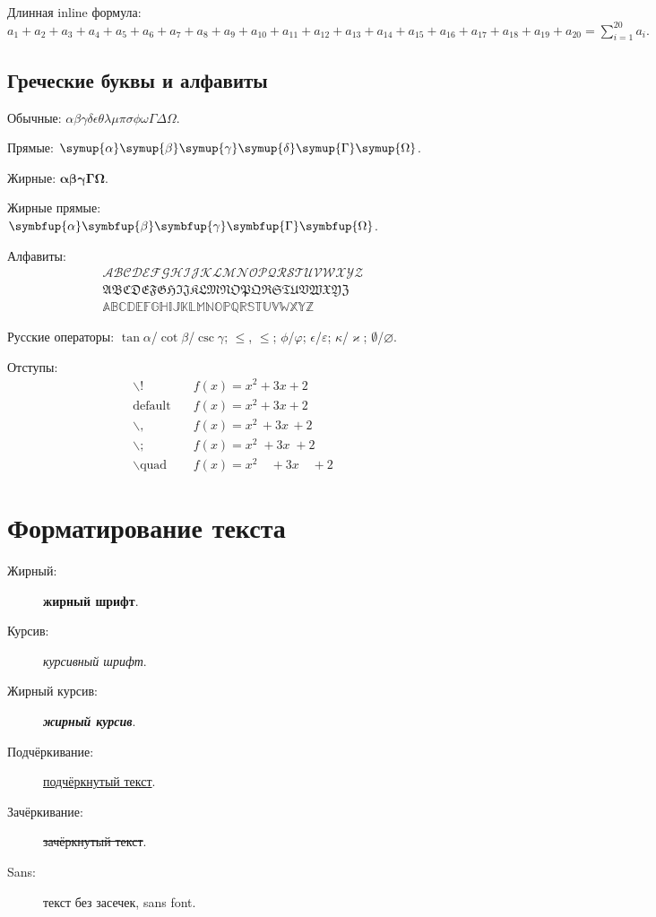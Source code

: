 \documentclass[font=modern]{cmcmsuthesis-cw}
\begin{document}
Длинная inline формула:
$a_1+a_2+a_3+a_4+a_5+a_6+a_7+a_8+a_9+a_{10}+a_{11}+a_{12}+a_{13}+a_{14}+a_{15}+a_{16}+a_{17}+a_{18}+a_{19}+a_{20}=\sum_{i=1}^{20}a_i.$

\subsection{Греческие буквы и алфавиты}

Обычные: $\alpha\beta\gamma\delta\epsilon\theta\lambda\mu\pi\sigma\phi\omega\Gamma\Delta\Omega$.

Прямые: $\symup{\alpha}\symup{\beta}\symup{\gamma}\symup{\delta}\symup{\Gamma}\symup{\Omega}$.

Жирные: $\symbf{\alpha}\symbf{\beta}\symbf{\gamma}\symbf{\Gamma}\symbf{\Omega}$.

Жирные прямые: $\symbfup{\alpha}\symbfup{\beta}\symbfup{\gamma}\symbfup{\Gamma}\symbfup{\Omega}$.

Алфавиты:
\[\begin{aligned}
\mathcal{ABCDEFGHIJKLMNOPQRSTUVWXYZ}\\
\mathfrak{ABCDEFGHIJKLMNOPQRSTUVWXYZ}\\
\mathbb{ABCDEFGHIJKLMNOPQRSTUVWXYZ}
\end{aligned}\]

Русские операторы: $\tan\alpha$/$\cot\beta$/$\csc\gamma$;
$\le$, $\leqslant$; $\phi$/$\varphi$; $\epsilon$/$\varepsilon$;
$\kappa$/$\varkappa$; $\emptyset$/$\varnothing$.

Отступы:
\[\begin{aligned}
\backslash! &\quad f(x)=x^2\!+3x\!+2\\
\text{default}&\quad f(x)=x^2+3x+2\\
\backslash, &\quad f(x)=x^2\,+3x\,+2\\
\backslash; &\quad f(x)=x^2\;+3x\;+2\\
\backslash\text{quad}&\quad f(x)=x^2\quad+3x\quad+2
\end{aligned}\]

\section{Форматирование текста}

\begin{description}
\item[Жирный:] \textbf{жирный шрифт}.
\item[Курсив:] \emph{курсивный шрифт}.
\item[Жирный курсив:] \textbf{\emph{жирный курсив}}.
\item[Подчёркивание:] \underline{подчёркнутый текст}.
\item[Зачёркивание:] \sout{зачёркнутый текст}.
\item[Sans:] \textsf{текст без засечек, sans font}.
\end{description}
\end{document}
